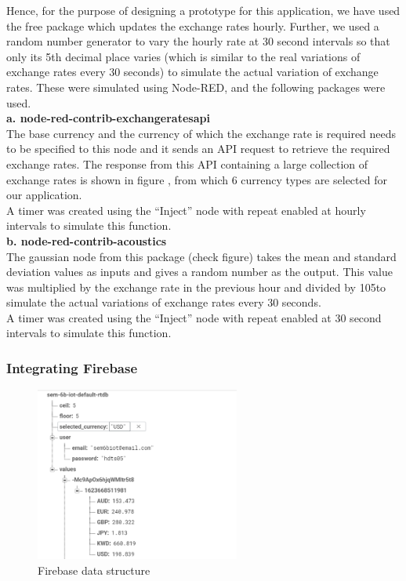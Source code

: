 Hence, for the purpose of designing a prototype for this application, we have used the free package which updates the exchange rates hourly. Further, we used a random number generator to vary the hourly rate at 30 second intervals so that only its 5th decimal place varies (which is similar to the real variations of exchange rates every 30 seconds) to simulate the actual variation of exchange rates. These were simulated using Node-RED, and the following packages were used.\\

\textbf{a. node-red-contrib-exchangeratesapi \cite{api}}\\

The base currency and the currency of which the exchange rate is required needs to be specified to this node and it sends an API request to retrieve the required exchange rates. The response from this API containing a large collection of exchange rates is shown in figure , from which 6 currency types are selected for our application.\\

A timer was created using the “Inject” node with repeat enabled at hourly intervals to simulate this function.\\

\textbf{b. node-red-contrib-acoustics \cite{acoustics}}\\

The gaussian node from this package (check figure) takes the mean and standard deviation values as inputs and gives a random number as the output. This value was multiplied by the exchange rate in the previous hour and divided by 105to simulate the actual variations of exchange rates every 30 seconds.\\

A timer was created using the “Inject” node with repeat enabled at 30 second intervals to simulate this function.


\subsubsection{Integrating Firebase}

\begin{figure}[H]
    \centering
      \includegraphics[width=0.6\textwidth]{images/fire.png}
    \caption{Firebase data structure}
    \label{exapi}
\end{figure}

